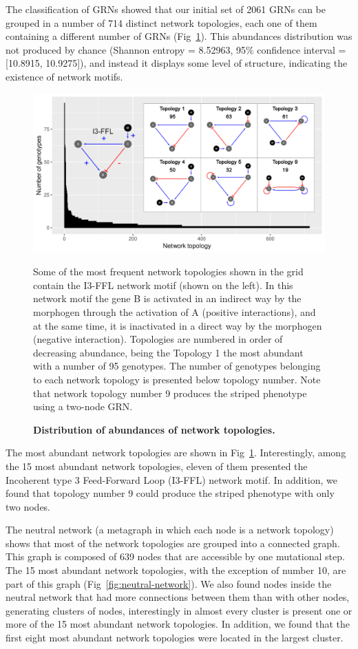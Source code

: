 \documentclass[10pt,letterpaper]{article}
\begin{document}
The classification of GRNs showed that our initial set of 2061 GRNs can be
grouped in a number of 714 distinct network topologies, each one of them
containing a different number of GRNs (Fig~\ref{fig:distopol}). This abundances
distribution was not produced by chance (Shannon entropy = 8.52963, 95\%
confidence interval = [10.8915, 10.9275]), and instead it displays some level
of structure, indicating the existence of network motifs.

\begin{figure}[!h]
 \includegraphics[width=\textwidth]{figures/results/Fig2}
 \caption{\bf Distribution of abundances of network topologies.}
 Some of the most frequent network topologies shown in the grid
 contain the I3-FFL network motif (shown on the left). In this network
 motif the gene B is activated in an indirect way by the morphogen through
 the activation of A (positive interactions), and at the same time, it
 is inactivated in a direct way by the morphogen (negative interaction).
 Topologies are numbered in order of decreasing abundance, being the
 Topology 1 the most abundant with a number of 95 genotypes. The number of
 genotypes belonging to each network topology is presented below
 topology number.
 Note that network topology number 9 produces the striped phenotype using a
 two-node GRN.
 \label{fig:distopol}
\end{figure}

The most abundant network topologies are shown in Fig~\ref{fig:distopol}.
Interestingly, among the 15 most abundant network topologies, eleven of them
presented the Incoherent type 3 Feed-Forward Loop (I3-FFL) network motif. In
addition, we found that topology number 9 could produce the striped phenotype
with only two nodes.

The neutral network (a metagraph in which each node is a network topology)
shows that most of the network topologies are grouped into a connected graph.
This graph is composed of 639 nodes that are accessible by one mutational step.
The 15 most abundant network topologies, with the exception of
number 10, are part of this graph (Fig~\ref{fig:neutral-network}). We also
found nodes inside the neutral network that had more connections between them
than with other nodes, generating clusters of nodes, interestingly in
almost every cluster is present one or more of the 15 most abundant network
topologies. In addition, we found that the first eight most abundant network
topologies were located in the largest cluster.
\end{document}
